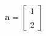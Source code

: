 \documentclass[preview]{standalone}
\begin{document}
\begin{align*}
\mathbf{a} = \begin{bmatrix}1 \\ \\ 2 \end{bmatrix}
\end{align*}
\end{document}
